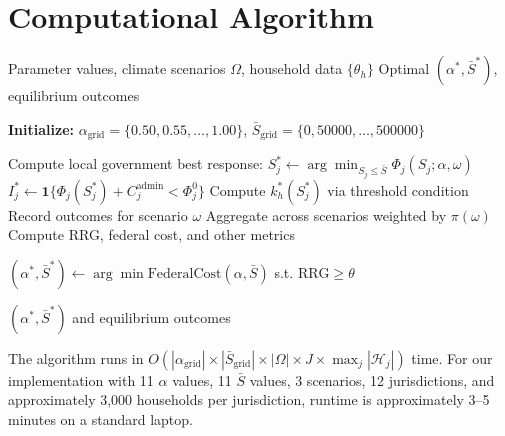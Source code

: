 \documentclass[11pt,letterpaper]{article}
\theoremstyle{definition}
\begin{document}
\section{Computational Algorithm}

\begin{algorithm}[H]
\caption{Solving the Three-Level Stochastic Stackelberg Game}
\label{alg:solve}
\begin{algorithmic}[1]
\REQUIRE Parameter values, climate scenarios $\Omega$, household data $\{\theta_h\}$
\ENSURE Optimal $(\alpha^*, \bar{S}^*)$, equilibrium outcomes

\STATE \textbf{Initialize:} $\alpha_{\text{grid}} = \{0.50, 0.55, \ldots, 1.00\}$, $\bar{S}_{\text{grid}} = \{0, 50000, \ldots, 500000\}$

            \STATE Compute local government best response:
            \STATE \quad $S_j^* \leftarrow \arg\min_{S_j \leq \bar{S}} \Phi_j(S_j; \alpha, \omega)$
            \STATE \quad $I_j^* \leftarrow \mathbf{1}\{\Phi_j(S_j^*) + C_j^{\text{admin}} < \Phi_j^0\}$
                    \STATE Compute $k_h^*(S_j^*)$ via threshold condition
                \ENDFOR
            \ENDIF
        \ENDFOR
        \STATE Record outcomes for scenario $\omega$
    \ENDFOR
    \STATE Aggregate across scenarios weighted by $\pi(\omega)$
    \STATE Compute RRG, federal cost, and other metrics
\ENDFOR

\STATE $(\alpha^*, \bar{S}^*) \leftarrow \arg\min \text{FederalCost}(\alpha, \bar{S})$ s.t. $\text{RRG} \geq \theta$

\RETURN $(\alpha^*, \bar{S}^*)$ and equilibrium outcomes
\end{algorithmic}
\end{algorithm}

The algorithm runs in $O(|\alpha_{\text{grid}}| \times |\bar{S}_{\text{grid}}| \times |\Omega| \times J \times \max_j |\mathcal{H}_j|)$ time. For our implementation with 11 $\alpha$ values, 11 $\bar{S}$ values, 3 scenarios, 12 jurisdictions, and approximately 3,000 households per jurisdiction, runtime is approximately 3--5 minutes on a standard laptop.

\end{document}
